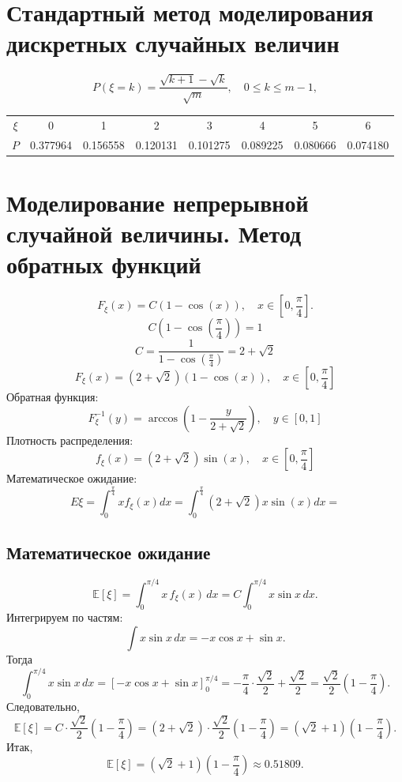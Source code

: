 \documentclass[bachelor, och, pract3]{SCWorks}
\begin{document}
\section{Стандартный метод моделирования дискретных случайных величин}

\[
	P(\xi = k) = \frac{\sqrt{k+1} - \sqrt{k}}{\sqrt{m}}, \quad 0 \leq k \leq m-1,
\]

\begin{tabular}{cccccccc}
	$\xi$ & 0 & 1 & 2 & 3 & 4 & 5 & 6 \\
	$P$ & 0.377964 & 0.156558 & 0.120131 & 0.101275 & 0.089225 & 0.080666 & 0.074180
\end{tabular}




\section{Моделирование непрерывной случайной величины. Метод обратных функций}


\[
	F_\xi(x) = C(1-\cos(x)), \quad x \in \left[0, \frac{\pi}{4}\right].
\]
\[
C\left(1-\cos\left(\frac{\pi}{4}\right)\right) = 1
\]
\[
C = \frac{1}{1-\cos\left(\frac{\pi}{4}\right)} = 2 + \sqrt{2}
\]
\[
F_\xi(x) = (2 + \sqrt{2})(1 - \cos(x)), \quad x \in \left[0, \frac{\pi}{4}\right]
\]
Обратная функция:
\[
F_\xi^{-1}(y) = \arccos\left(1 - \frac{y}{2 + \sqrt{2}}\right), \quad y \in [0, 1]
\]
Плотность распределения:
\[
f_\xi(x) = (2 + \sqrt{2}) \sin(x), \quad x \in \left[0, \frac{\pi}{4}\right]
\]
Математическое ожидание:
\[
E\xi = \int_{0}^{\frac{\pi}{4}} x f_\xi(x) dx = \int_{0}^{\frac{\pi}{4}} (2 + \sqrt{2}) x \sin(x) dx = 
\]


\subsection{Математическое ожидание}
\[
\mathbb E[\xi]=\int_0^{\pi/4} x\, f_\xi(x)\,dx
= C\int_0^{\pi/4} x\sin x\,dx.
\]
Интегрируем по частям:
\[
\int x\sin x\,dx = -x\cos x+\sin x.
\]
Тогда
\[
\int_0^{\pi/4} x\sin x\,dx
= \left[-x\cos x+\sin x\right]_0^{\pi/4}
= -\frac{\pi}{4}\cdot\frac{\sqrt2}{2}+\frac{\sqrt2}{2}
= \frac{\sqrt2}{2}\left(1-\frac{\pi}{4}\right).
\]
Следовательно,
\[
\mathbb E[\xi]
= C\cdot \frac{\sqrt2}{2}\left(1-\frac{\pi}{4}\right)
= (2+\sqrt2)\cdot\frac{\sqrt2}{2}\left(1-\frac{\pi}{4}\right)
= (\sqrt2+1)\left(1-\frac{\pi}{4}\right).
\]
Итак,
\[
\mathbb E[\xi]=(\sqrt2+1)\left(1-\frac{\pi}{4}\right) \approx 0.51809.
\]
\end{document}
